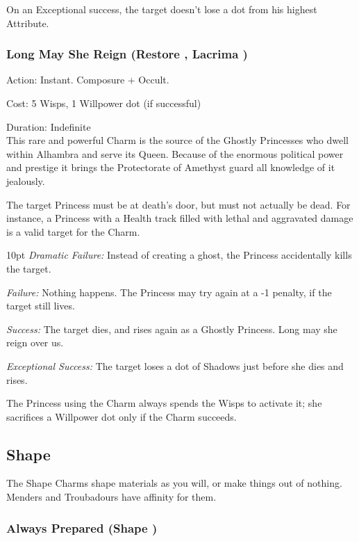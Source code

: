 On an Exceptional success, the target doesn't lose a dot from his highest Attribute.

\subsubsection*{Long May She Reign (Restore \textbullet\textbullet\textbullet\textbullet\textbullet, Lacrima \textbullet\textbullet\textbullet\textbullet\textbullet)}

\noindent Action: Instant. Composure + Occult.

\noindent Cost: 5 Wisps, 1 Willpower dot (if successful)

\noindent Duration: Indefinite \\

\noindent This rare and powerful Charm is the source of the Ghostly Princesses who dwell within Alhambra and serve its Queen. Because of the enormous political power and prestige it brings the Protectorate of Amethyst guard all knowledge of it jealously.

The target Princess must be at death's door, but must not actually be dead. For instance, a Princess with a Health track filled with lethal and aggravated damage is a valid target for the Charm.

\begin{myindentpar}{10pt}    \emph{Dramatic Failure:} Instead of creating a ghost, the Princess accidentally kills the target.

    \emph{Failure:} Nothing happens. The Princess may try again at a -1 penalty, if the target still lives.
    
    \emph{Success:} The target dies, and rises again as a Ghostly Princess. Long may she reign over us.
    
    \emph{Exceptional Success:} The target loses a dot of Shadows just before she dies and rises.\end{myindentpar}

The Princess using the Charm always spends the Wisps to activate it; she sacrifices a Willpower dot only if the Charm succeeds.

\subsection*{Shape}
The Shape Charms shape materials as you will, or make things out of nothing. Menders and Troubadours have affinity for them.
\subsubsection*{Always Prepared (Shape \textbullet)}


